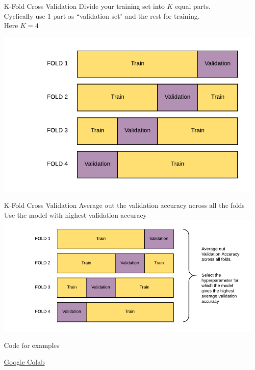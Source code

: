 \documentclass{beamer}
\begin{document}
	\begin{frame}{K-Fold Cross Validation}
	Divide your training set into $K$ equal 	parts.\\
	 Cyclically use 1 part as ``validation set" and the rest for training.\\
	Here $K = 4$
	\begin{center}
	\includegraphics[scale=0.7]{cross-validation}
	\end{center}
	\end{frame}

	\begin{frame}{K-Fold Cross Validation}
	Average out the validation accuracy across all the folds\\
	Use the model with highest validation accuracy\\
	\includegraphics[width = \textwidth]{cross-validation-avg}
	\end{frame}

	\begin{frame}{Code for examples}
	\begin{center}
	\href{https://colab.research.google.com/drive/18E4HCN82GSa8-81h9yw2daHVg146IuWe}{Google Colab}
	\end{center}
	\end{frame}
\end{document}
